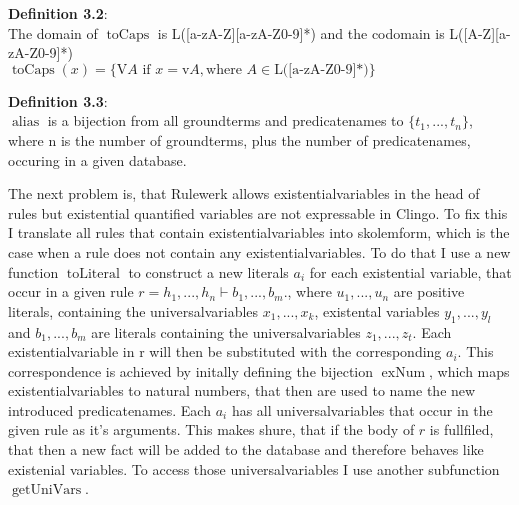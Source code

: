 \documentclass[hyperref, bachelorofscience]{cgvpub}
\renewenvironment{shaded}{%
  \def\FrameCommand{\fboxsep=\FrameSep \colorbox{shadecolor}}%
  \MakeFramed{\advance\hsize-\width \FrameRestore\FrameRestore}}%
 {\endMakeFramed}
\DeclareMathOperator{\alias}{alias}
\DeclareMathOperator{\toCaps}{toCaps}
\DeclareMathOperator{\getUniVars}{getUniVars}
\DeclareMathOperator{\toLiteral}{toLiteral}
\DeclareMathOperator{\exNum}{exNum}
\begin{document}
\begin{shaded}
\textbf{Definition 3.2}: \\
The domain of $\toCaps$ is L([a-zA-Z][a-zA-Z0-9]*) and the codomain is L([A-Z][a-zA-Z0-9]*) \\
$\toCaps(x) = \{\text{V}A \text{ if } x = \text{v}A, \text{where } A \in \text{L([a-zA-Z0-9]*)} \}$
\end{shaded}

\begin{shaded}
\textbf{Definition 3.3}: \\
$\alias$ is a bijection from all groundterms and predicatenames to $\{t_1,...,t_n\}$, where n is the number of groundterms, plus the number of predicatenames, occuring in a given database. 
\end{shaded}

The next problem is, that Rulewerk allows existentialvariables in the head of rules but existential quantified variables are not expressable in Clingo. To fix this I translate all rules that contain existentialvariables into skolemform, which is the case when a rule does not contain any existentialvariables. To do that I use a new function $\toLiteral$ to construct a new literals $a_i$ for each existential variable, that occur in a given rule $r = h_1,...,h_n \vdash b_1,...,b_m .$, where $u_1,...,u_n$ are  positive literals, containing the universalvariables $x_1,...,x_k$, existental variables $y_1,...,y_l$ and $b_1,...,b_m$ are literals containing the universalvariables $z_1,...,z_t$. Each existentialvariable in r will then be substituted with the corresponding $a_i$. This correspondence is achieved by initally defining the bijection $\exNum$, which maps existentialvariables to natural numbers, that then are used to name the new introduced predicatenames. Each $a_i$ has all universalvariables that occur in the given rule as it's arguments. This makes shure, that if the body of $r$ is fullfiled, that then a new fact will be added to the database and therefore behaves like existenial variables. To access those universalvariables I use another subfunction $\getUniVars$. 



\end{document}
